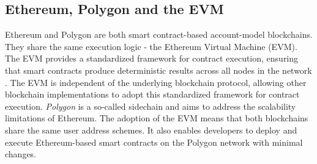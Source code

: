 \documentclass[12pt,a4paper,titlepage,oneside,english]{article}
\begin{document}
\subsection{Ethereum, Polygon and the EVM}
Ethereum and Polygon are both smart contract-based account-model blockchains. They share the same execution logic - the Ethereum Virtual Machine (EVM).
The EVM provides a standardized framework for contract execution, ensuring that smart contracts produce deterministic results across all nodes in the network \citep{GW:14}. The EVM is independent of the underlying blockchain protocol, allowing other blockchain implementations to adopt this standardized framework for contract execution.\newline
\textit{Polygon} is a so-called sidechain and aims to address the scalability limitations of Ethereum. The adoption of the EVM means that both blockchains share the same user address schemes. It also enables developers to deploy and execute Ethereum-based smart contracts on the Polygon network with minimal changes. \citep{matic_whitepaper}
\end{document}

